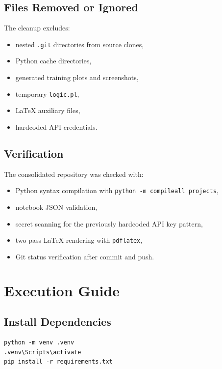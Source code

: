 \documentclass[11pt,a4paper]{article}
\newcommand{\code}[1]{\texttt{#1}}
\begin{document}
\subsection{Files Removed or Ignored}

The cleanup excludes:

\begin{itemize}[leftmargin=*]
    \item nested \code{.git} directories from source clones,
    \item Python cache directories,
    \item generated training plots and screenshots,
    \item temporary \code{logic.pl},
    \item LaTeX auxiliary files,
    \item hardcoded API credentials.
\end{itemize}

\subsection{Verification}

The consolidated repository was checked with:

\begin{itemize}[leftmargin=*]
    \item Python syntax compilation with \code{python -m compileall projects},
    \item notebook JSON validation,
    \item secret scanning for the previously hardcoded API key pattern,
    \item two-pass LaTeX rendering with \code{pdflatex},
    \item Git status verification after commit and push.
\end{itemize}

\section{Execution Guide}

\subsection{Install Dependencies}

\begin{lstlisting}
python -m venv .venv
.venv\Scripts\activate
pip install -r requirements.txt
\end{lstlisting}
\end{document}

